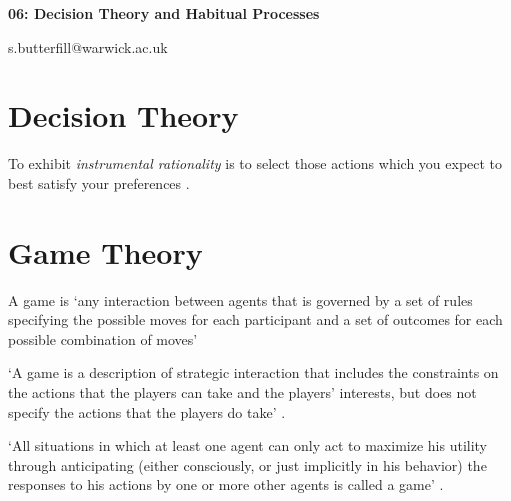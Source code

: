 \documentclass[12pt]{extarticle}
\date{}
\makeatletter
\def \ititle {Philosophical Psychology}
\def \iemail{s.butterfill@warwick.ac.uk}
\makeatother
\begin{document}
\begin{multicols*}{3}

\setlength\footnotesep{1em}











\def \ititle {06: Decision Theory and Habitual Processes}

\begin{center}

{\Large

\textbf{\ititle}

}



\iemail %

\end{center}




 
 
\section{Decision Theory}
 
 
To exhibit \emph{instrumental rationality} is to select those actions which you expect to best satisfy your preferences \citep[textbook:][]{Jeffrey:1983oe}.



\section{Game Theory}
A game is ‘any interaction between agents that is governed by a set of rules 
specifying the possible moves for each participant and a set of outcomes for each possible combination of moves’
\citep[p.~3]{hargreaves:2004_game}
 
‘A game is a description of strategic interaction that includes the constraints on the actions that the players can take and the players’ interests, but does not specify the actions that the players do take’
\citep[p.~2]{osborne:1994_game}.
 
‘All situations in which at least one agent can only act to maximize his utility through anticipating (either consciously, or just implicitly in his behavior) the responses to his actions by one or more other agents is called a game’
\citep{ross:2018_game}.



\end{multicols*}
\end{document}
